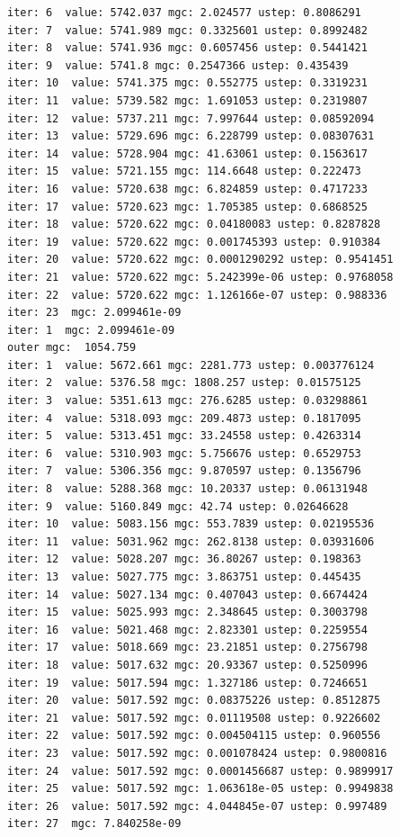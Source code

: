 \documentclass[
  letterpaper,
  DIV=11,
  numbers=noendperiod]{scrartcl}
\begin{document}
\begin{verbatim}
iter: 6  value: 5742.037 mgc: 2.024577 ustep: 0.8086291 
iter: 7  value: 5741.989 mgc: 0.3325601 ustep: 0.8992482 
iter: 8  value: 5741.936 mgc: 0.6057456 ustep: 0.5441421 
iter: 9  value: 5741.8 mgc: 0.2547366 ustep: 0.435439 
iter: 10  value: 5741.375 mgc: 0.552775 ustep: 0.3319231 
iter: 11  value: 5739.582 mgc: 1.691053 ustep: 0.2319807 
iter: 12  value: 5737.211 mgc: 7.997644 ustep: 0.08592094 
iter: 13  value: 5729.696 mgc: 6.228799 ustep: 0.08307631 
iter: 14  value: 5728.904 mgc: 41.63061 ustep: 0.1563617 
iter: 15  value: 5721.155 mgc: 114.6648 ustep: 0.222473 
iter: 16  value: 5720.638 mgc: 6.824859 ustep: 0.4717233 
iter: 17  value: 5720.623 mgc: 1.705385 ustep: 0.6868525 
iter: 18  value: 5720.622 mgc: 0.04180083 ustep: 0.8287828 
iter: 19  value: 5720.622 mgc: 0.001745393 ustep: 0.910384 
iter: 20  value: 5720.622 mgc: 0.0001290292 ustep: 0.9541451 
iter: 21  value: 5720.622 mgc: 5.242399e-06 ustep: 0.9768058 
iter: 22  value: 5720.622 mgc: 1.126166e-07 ustep: 0.988336 
iter: 23  mgc: 2.099461e-09 
iter: 1  mgc: 2.099461e-09 
outer mgc:  1054.759 
iter: 1  value: 5672.661 mgc: 2281.773 ustep: 0.003776124 
iter: 2  value: 5376.58 mgc: 1808.257 ustep: 0.01575125 
iter: 3  value: 5351.613 mgc: 276.6285 ustep: 0.03298861 
iter: 4  value: 5318.093 mgc: 209.4873 ustep: 0.1817095 
iter: 5  value: 5313.451 mgc: 33.24558 ustep: 0.4263314 
iter: 6  value: 5310.903 mgc: 5.756676 ustep: 0.6529753 
iter: 7  value: 5306.356 mgc: 9.870597 ustep: 0.1356796 
iter: 8  value: 5288.368 mgc: 10.20337 ustep: 0.06131948 
iter: 9  value: 5160.849 mgc: 42.74 ustep: 0.02646628 
iter: 10  value: 5083.156 mgc: 553.7839 ustep: 0.02195536 
iter: 11  value: 5031.962 mgc: 262.8138 ustep: 0.03931606 
iter: 12  value: 5028.207 mgc: 36.80267 ustep: 0.198363 
iter: 13  value: 5027.775 mgc: 3.863751 ustep: 0.445435 
iter: 14  value: 5027.134 mgc: 0.407043 ustep: 0.6674424 
iter: 15  value: 5025.993 mgc: 2.348645 ustep: 0.3003798 
iter: 16  value: 5021.468 mgc: 2.823301 ustep: 0.2259554 
iter: 17  value: 5018.669 mgc: 23.21851 ustep: 0.2756798 
iter: 18  value: 5017.632 mgc: 20.93367 ustep: 0.5250996 
iter: 19  value: 5017.594 mgc: 1.327186 ustep: 0.7246651 
iter: 20  value: 5017.592 mgc: 0.08375226 ustep: 0.8512875 
iter: 21  value: 5017.592 mgc: 0.01119508 ustep: 0.9226602 
iter: 22  value: 5017.592 mgc: 0.004504115 ustep: 0.960556 
iter: 23  value: 5017.592 mgc: 0.001078424 ustep: 0.9800816 
iter: 24  value: 5017.592 mgc: 0.0001456687 ustep: 0.9899917 
iter: 25  value: 5017.592 mgc: 1.063618e-05 ustep: 0.9949838 
iter: 26  value: 5017.592 mgc: 4.044845e-07 ustep: 0.997489 
iter: 27  mgc: 7.840258e-09 

\end{verbatim}
\end{document}
